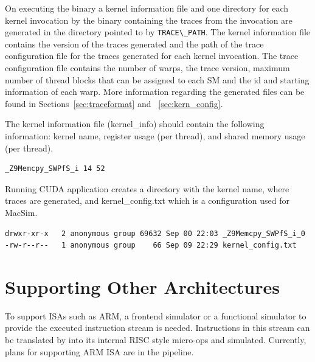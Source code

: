 On executing the binary a kernel information file and one directory for each
kernel invocation by the binary containing the traces from the invocation are
generated in the directory pointed to by \Verb+TRACE\_PATH+. The kernel
information file contains the version of the traces generated and the path of
the trace configuration file for the traces generated for each kernel
invocation. The trace configuration file contains the number of warps, the
trace version, maximum number of thread blocks that can be assigned to each SM
and the id and starting information of each warp. More information regarding
the generated files can be found in Sections~\ref{sec:traceformat} and
~\ref{sec:kern_config}. 


\ignore
{
The kernel information file (kernel\_info) should contain the following
information: kernel name, register usage (per thread), and shared memory usage
(per thread).


\begin{Verbatim}
_Z9Memcpy_SWPfS_i 14 52 
\end{Verbatim}


Running CUDA application creates a directory with the kernel name, where traces 
are generated, and kernel\_config.txt which is a configuration used for MacSim.


\begin{Verbatim}
drwxr-xr-x   2 anonymous group 69632 Sep 00 22:03 _Z9Memcpy_SWPfS_i_0
-rw-r--r--   1 anonymous group    66 Sep 09 22:29 kernel_config.txt
\end{Verbatim}
}


\section{Supporting Other Architectures}

To support ISAs such as ARM, a frontend simulator or a functional simulator to
provide the executed instruction stream is needed. Instructions in this stream
can be translated by \SIM into its internal RISC style micro-ops and simulated. 
Currently, plans for supporting ARM ISA are in the pipeline.



